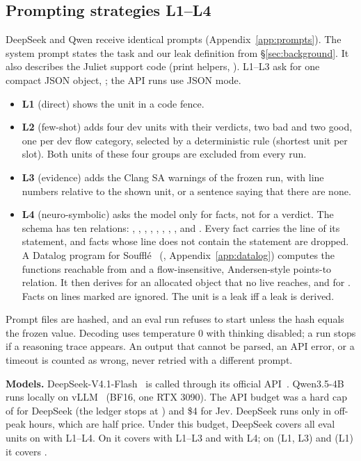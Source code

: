 \subsection{Prompting strategies L1--L4}
\label{sec:m-strategies}
DeepSeek and Qwen receive identical prompts (Appendix~\ref{app:prompts}).
The system prompt states the task and our leak definition from \S\ref{sec:background}.
It also describes the Juliet support code (print helpers, ).
L1--L3 ask for one compact JSON object, ; the API runs use JSON mode.
\begin{itemize}
\item \textbf{L1} (direct) shows the unit in a code fence.
\item \textbf{L2} (few-shot) adds four dev units with their verdicts, two bad and two good, one per dev flow category, selected by a deterministic rule (shortest unit per slot). Both units of these four groups are excluded from every run.
\item \textbf{L3} (evidence) adds the Clang SA warnings of the frozen  run, with line numbers relative to the shown unit, or a sentence saying that there are none.
\item \textbf{L4} (neuro-symbolic) asks the model only for facts, not for a verdict. The schema has ten relations: , , , , , , , ,  and . Every fact carries the line of its statement, and facts whose line does not contain the statement are dropped. A Datalog program for Souffl\'e~\cite{jordan2016souffle} (, Appendix~\ref{app:datalog}) computes the functions reachable from  and a flow-insensitive, Andersen-style points-to relation. It then derives  for an allocated object that no live  reaches, and  for . Facts on lines marked  are ignored. The unit is a leak iff a leak is derived.
\end{itemize}
Prompt files are hashed, and an eval run refuses to start unless the hash equals the frozen value.
Decoding uses temperature 0 with thinking disabled; a run stops if a reasoning trace appears.
An output that cannot be parsed, an API error, or a timeout is counted as wrong, never retried with a different prompt. %

\noindent\textbf{Models.}
DeepSeek-V4.1-Flash~\cite{deepseek2026v4} is called through its official API~\cite{deepseekdocs}.
Qwen3.5-4B~\cite{qwen35card} runs locally on vLLM~\cite{kwon2023vllm} (BF16, one RTX 3090).
The API budget was a hard cap of  for DeepSeek (the ledger stops at ) and \$4 for Jev. %
DeepSeek runs only in off-peak hours, which are half price.
Under this budget, DeepSeek covers all eval units on \Deb{} with L1--L4. On \Dead{} it covers  with L1--L3 and  with L4; on \Plac{} (L1, L3) and \Orig{} (L1) it covers . %

